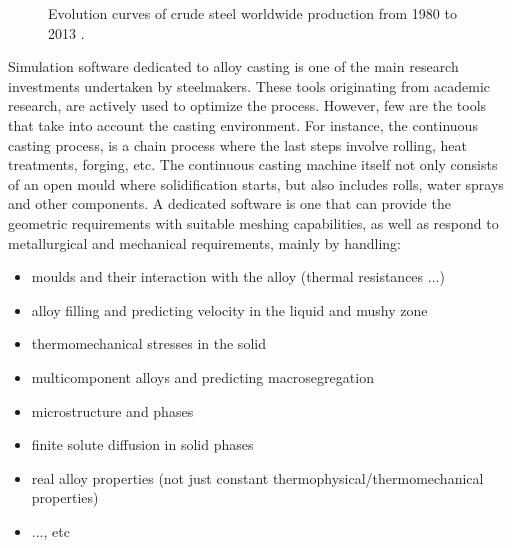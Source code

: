 \begin{figure}[htbp]
\centering
{}
\caption{Evolution curves of crude steel worldwide production from 1980 to 2013 \citep{wsa_world_2014}.}
\label{fig:steel_production}
\end{figure}

Simulation software dedicated to alloy casting is one of the main research investments undertaken by steelmakers. 
These tools originating from academic research, are actively used to optimize the process. 
However, few are the tools that take into account the casting environment. 
For instance, the continuous casting process, is a chain process where the last steps involve rolling, heat treatments, forging, etc. The continuous casting
machine itself not only consists of an open mould where solidification starts, but also includes rolls, water sprays and other components. 
A dedicated software is one that can provide the geometric requirements with suitable meshing capabilities, 
as well as respond to metallurgical and mechanical requirements, mainly by handling:
%
\begin{itemize}
\itemsep0em
\item moulds and their interaction with the alloy (thermal resistances ...)
\item alloy filling and predicting velocity in the liquid and mushy zone
\item thermomechanical stresses in the solid
\item multicomponent alloys and predicting macrosegregation
\item microstructure and phases
\item finite solute diffusion in solid phases
\item real alloy properties (not just constant thermophysical/thermomechanical properties)
\item ..., etc
\end{itemize}
%
%
